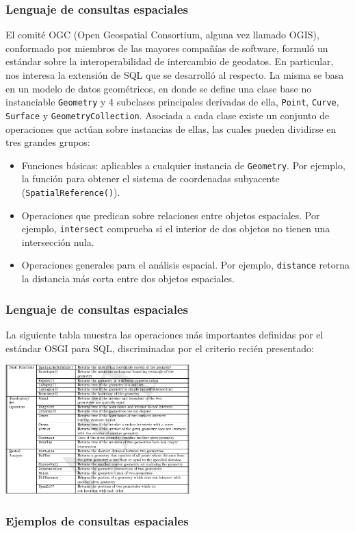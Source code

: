 \begin{frame}
		\frametitle{Lenguaje de consultas espaciales}
		El comité OGC (Open Geospatial Consortium, alguna vez llamado OGIS), conformado por miembros de las mayores compañías de software, formuló un estándar sobre la interoperabilidad de intercambio de geodatos. En particular, nos interesa la extensión de SQL que se desarrolló al respecto. \pause
		La misma se basa en un modelo de datos geométricos, en donde se define una clase base no instanciable \texttt{Geometry} y 4 subclases principales derivadas de ella, \texttt{Point}, \texttt{Curve}, \texttt{Surface} y \texttt{GeometryCollection}.
		Asociada a cada clase existe un conjunto de operaciones que actúan sobre instancias de ellas, las cuales pueden dividirse en tres grandes grupos: \\ \pause
		\begin{itemize}
			\item Funciones básicas: aplicables a cualquier instancia de \texttt{Geometry}. Por ejemplo, la función para obtener el sistema de coordenadas subyacente (\texttt{SpatialReference()}).
			\item Operaciones que predican sobre relaciones entre objetos espaciales. Por ejemplo, \texttt{intersect} comprueba si el interior de dos objetos no tienen una intersección nula.
			\item Operaciones generales para el análisis espacial. Por ejemplo, \texttt{distance} retorna la distancia más corta entre dos objetos espaciales.
		\end{itemize}
\end{frame}

\begin{frame}
		\frametitle{Lenguaje de consultas espaciales}
		La siguiente tabla muestra las operaciones más importantes definidas por el estándar OSGI para SQL, discriminadas por el criterio recién presentado: \\
	\begin{center}
	\includegraphics[height=5cm]{tablaOGIS.png}
	\end{center}
\end{frame}

\begin{frame}
		\frametitle{Ejemplos de consultas espaciales}
\end{frame}
